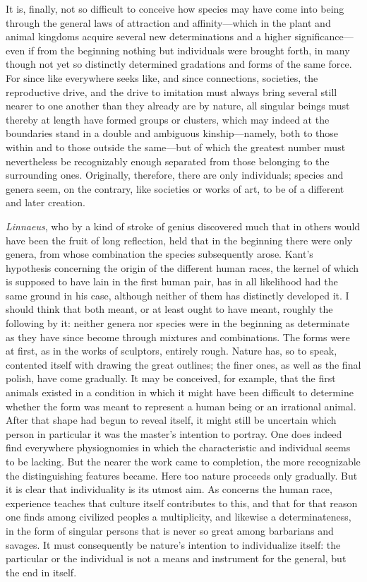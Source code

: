 \documentclass[12pt,a4paper]{article}
\begin{document}
It is, finally, not so difficult to conceive how species may have come into
being through the general laws of attraction and affinity---which in the plant
and animal kingdoms acquire several new determinations and a higher
significance---even if from the beginning nothing but individuals were brought
forth, in many though not yet so distinctly determined gradations and forms of
the same force. For since like everywhere seeks like, and since connections,
societies, the reproductive drive, and the drive to imitation must always bring
several still nearer to one another than they already are by nature, all
singular beings must thereby at length have formed groups or clusters, which may
indeed at the boundaries stand in a double and ambiguous kinship---namely, both
to those within and to those outside the same---but of which the greatest number
must nevertheless be recognizably enough separated from those belonging to the
surrounding ones. Originally, therefore, there are only individuals; species and
genera seem, on the contrary, like societies or works of art, to be of a
different and later creation.

\emph{Linnaeus}, who by a kind of stroke of genius discovered much that in
others would have been the fruit of long reflection, held that in the beginning
there were only genera, from whose combination the species subsequently arose.
Kant's hypothesis concerning the origin of the different human races, the kernel
of which is supposed to have lain in the first human pair, has in all likelihood
had the same ground in his case, although neither of them has distinctly
developed it. I should think that both meant, or at least ought to have meant,
roughly the following by it: neither genera nor species were in the beginning as
determinate as they have since become through mixtures and combinations. The
forms were at first, as in the works of sculptors, entirely rough. Nature has,
so to speak, contented itself with drawing the great outlines; the finer ones,
as well as the final polish, have come gradually. It may be conceived, for
example, that the first animals existed in a condition in which it might have
been difficult to determine whether the form was meant to represent a human
being or an irrational animal. After that shape had begun to reveal itself, it
might still be uncertain which person in particular it was the master's intention
to portray. One does indeed find everywhere physiognomies in which the
characteristic and individual seems to be lacking. But the nearer the work came
to completion, the more recognizable the distinguishing features became. Here
too nature proceeds only gradually. But it is clear that individuality is its
utmost aim. As concerns the human race, experience teaches that culture itself
contributes to this, and that for that reason one finds among civilized peoples
a multiplicity, and likewise a determinateness, in the form of singular persons
that is never so great among barbarians and savages. It must consequently be
nature's intention to individualize itself: the particular or the individual is
not a means and instrument for the general, but the end in itself.
\end{document}
